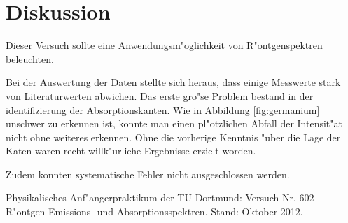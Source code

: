 \newpage
\section{Diskussion}
	\label{sec:diskussion}
	Dieser Versuch sollte eine Anwendungsm"oglichkeit von R"ontgenspektren beleuchten.

	Bei der Auswertung der Daten stellte sich heraus, dass einige Messwerte stark von Literaturwerten abwichen.
	Das erste gro"se Problem bestand in der identifizierung der Absorptionskanten.
	Wie in Abbildung \ref{fig:germanium} unschwer zu erkennen ist, konnte man einen pl"otzlichen Abfall der Intensit"at nicht ohne weiteres erkennen.
	Ohne die vorherige Kenntnis "uber die Lage der Katen waren recht willk"urliche Ergebnisse erzielt worden.

	Zudem konnten systematische Fehler nicht ausgeschlossen werden.
	
\begin{thebibliography}{9}
	 Physikalisches Anf"angerpraktikum der TU Dortmund: Versuch Nr. 602 - R"ontgen-Emissions- und Absorptionsspektren. Stand: Oktober 2012.
\end{thebibliography}